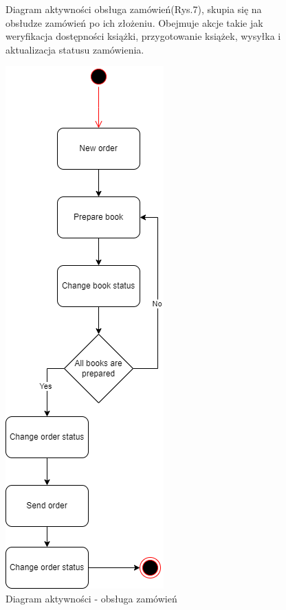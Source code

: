 \documentclass[]{article}
\begin{document}
\begin{figure}[ht]
	\begin{minipage}{\textwidth}
		Diagram aktywności obsługa zamówień(Rys.7), skupia się na obsłudze zamówień po ich złożeniu. Obejmuje akcje takie jak weryfikacja dostępności książki, przygotowanie książek, wysyłka i aktualizacja statusu zamówienia.
	\end{minipage}
	\vspace{15pt}

	\centering
	\includegraphics[scale=0.50]{obsl_zam.png}
	\caption{Diagram aktywności - obsługa zamówień}
\end{figure}
\end{document}
